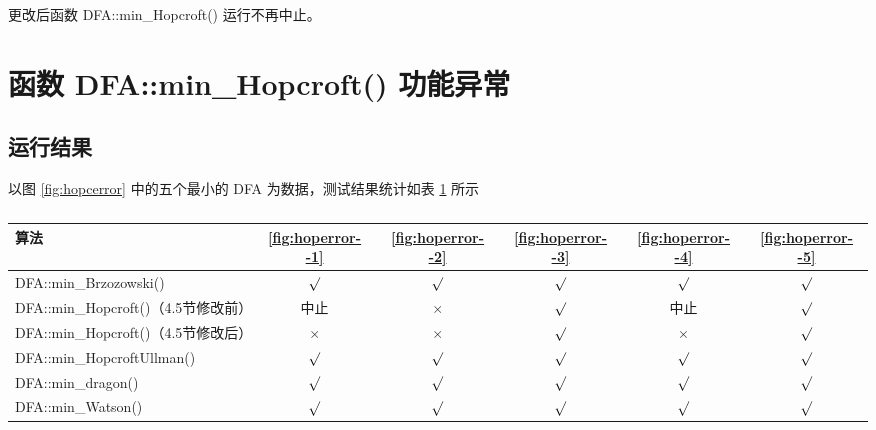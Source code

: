 更改后函数 DFA::min\_Hopcroft() 运行不再中止。



\section{函数 DFA::min\_Hopcroft() 功能异常}\label{sec:fixHopcroft}

\subsection{运行结果}

以图 \ref{fig:hopcerror} 中的五个最小的 DFA 为数据，测试结果统计如表 \ref{tab:KeepMinResultofAll} 所示

\begin{table}[!htbp]
    \caption{  }
    \label{tab:KeepMinResultofAll}
    \centering
    \small%
    \setlength{\tabcolsep}{6pt}%
    \renewcommand{\arraystretch}{1.2}%
    \begin{tabular}{l| ccccc} %
        \toprule %
        算法 & \ref{fig:hoperror--1} & \ref{fig:hoperror--2} & \ref{fig:hoperror--3} & \ref{fig:hoperror--4} &  \ref{fig:hoperror--5}  \\
        \midrule
        DFA::min\_Brzozowski()        & $\surd$ & $\surd$ & $\surd$ & $\surd$     & $\surd$        \\
        DFA::min\_Hopcroft()（4.5节修改前） & 中止    & $\times$ & $\surd$ & 中止        & $\surd$       \\
        DFA::min\_Hopcroft()（4.5节修改后） & $\times$& $\times$& $\surd$ & $\times$    & $\surd$       \\
        DFA::min\_HopcroftUllman()    & $\surd$ & $\surd$ & $\surd$ & $\surd$     & $\surd$       \\
        DFA::min\_dragon()            & $\surd$ & $\surd$ & $\surd$ & $\surd$     & $\surd$       \\
        DFA::min\_Watson()            & $\surd$ & $\surd$ & $\surd$ & $\surd$     & $\surd$       \\
        \bottomrule%
    \end{tabular}
\end{table}

